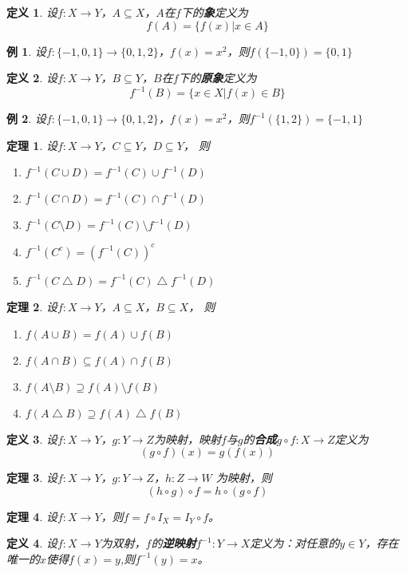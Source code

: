 \documentclass{article}
\newtheorem{Def}{定义}
\newtheorem{Thm}{定理}
\newtheorem*{Example}{例}
\begin{document}
\begin{CJK*}{UTF8}{gbsn}
  
  \begin{Def}
    设$f:X\to Y$，$A \subseteq X$，$A$在$f$下的{\bfseries 象}定义为\[f(A)=\{f(x)|x\in A\}\]
  \end{Def}
  \begin{Example}
    设$f:\{-1,0,1\}\to \{0,1,2\}$，$f(x)=x^2$，则$f(\{-1,0\})=\{0,1\}$
  \end{Example}
  \begin{Def}
    设$f:X\to Y$，$B \subseteq Y$，$B$在$f$下的{\bfseries 原象}定义为\[f^{-1}(B)=\{x\in X|f(x)\in B\}\]
  \end{Def}
  \begin{Example}
    设$f:\{-1,0,1\}\to \{0,1,2\}$，$f(x)=x^2$，则$f^{-1}(\{1,2\})=\{-1,1\}$
  \end{Example}
  \begin{Thm}
    设$f:X\to Y$，$C \subseteq Y$，$D \subseteq Y$， 则
    \begin{enumerate}
    \item $f^{-1}(C \cup D) = f^{-1}(C) \cup f^{-1}(D)$
    \item $f^{-1}(C \cap D) = f^{-1}(C) \cap f^{-1}(D)$
    \item $f^{-1}(C \setminus D)=f^{-1}(C) \setminus f^{-1}(D)$
    \item $f^{-1}(C^c) = (f^{-1}(C))^c$
    \item $f^{-1}(C \bigtriangleup D) = f^{-1}(C) \bigtriangleup f^{-1}(D)$
    \end{enumerate}
  \end{Thm}
    \begin{Thm}
    设$f:X\to Y$，$A \subseteq X$，$B \subseteq X$， 则
    \begin{enumerate}
    \item $f(A \cup B) = f(A) \cup f(B)$
    \item $f(A \cap B) \subseteq f(A) \cap f(B)$
    \item $f(A \setminus B) \supseteq f(A) \setminus f(B)$
    \item $f(A \bigtriangleup B) \supseteq f(A) \bigtriangleup f(B)$
    \end{enumerate}
  \end{Thm}

  \begin{Def}
    设$f:X\to Y$，$g:Y\to Z$为映射，映射$f$与$g$的{\bfseries 合成}$g\circ f:X\to Z$定义为\[(g\circ f)(x) = g(f(x))\]
  \end{Def}
\begin{Thm}
  设$f:X \to Y$，$g:Y\to Z$，$h:Z\to W$ 为映射，则 \[ (h \circ g) \circ f = h \circ (g \circ f) \]
\end{Thm}
\begin{Thm}
  设$f:X \to Y$，则$f = f\circ I_X = I_Y \circ f$。
\end{Thm}
  \begin{Def}
     设$f:X\to Y$为双射，$f$的{\bfseries 逆映射}$f^{-1}:Y\to X$定义为：对任意的$y\in Y$，存在唯一的$x$使得$f(x)=y$,则$f^{-1}(y)=x$。
   \end{Def}


\end{CJK*}
\end{document}
